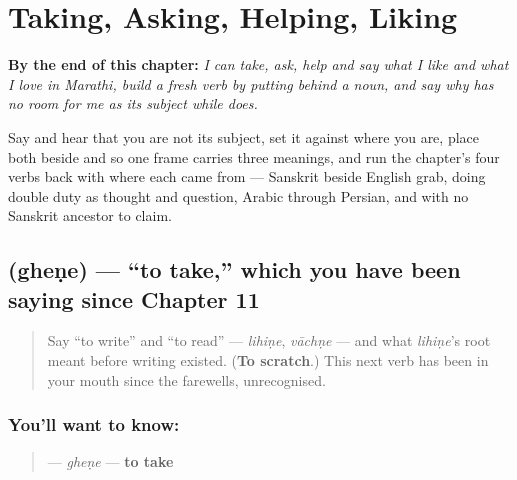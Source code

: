 
\chapter{Taking, Asking, Helping, Liking}
\label{ch:mr-doing-verbs}

\begin{chapteropening}
\textbf{By the end of this chapter:} \emph{I can take, ask, help and say what I like and what I love in Marathi, build a fresh verb by putting  behind a noun, and say why    has no room for me as its subject while    does.}

Say    and hear that you are not its subject, set it against    where you are, place both beside    and    so one frame carries three meanings, and run the chapter's four verbs back with where each came from — Sanskrit  beside English grab,  doing double duty as thought and question, Arabic  through Persian, and  with no Sanskrit ancestor to claim.
\end{chapteropening}

\section[\texorpdfstring{\mr{घेणे} (gheṇe)}{घेणे (gheṇe)}]{ (gheṇe) — \textquotedblleft{}to take,\textquotedblright{} which you have been saying since Chapter 11}

\label{lesson:MR-C09-ghene}



\begin{quote}
Say \textquotedblleft{}to write\textquotedblright{} and \textquotedblleft{}to read\textquotedblright{} — \emph{lihiṇe}, \emph{vāchṇe} — and what \emph{lihiṇe}'s root meant before writing existed. (\textbf{To scratch}.) This next verb has been in your mouth since the farewells, unrecognised.
\end{quote}

\subsection*{You'll want to know: }
\begin{quote}
\textbf{} — \emph{gheṇe} — \textbf{to take}
\end{quote}

